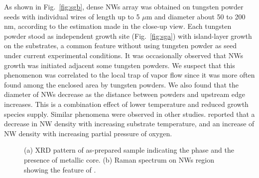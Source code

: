 As shown in Fig.~\ref{fig:sgb}, dense NWs array was obtained on tungsten powder seeds with individual wires of length up to 5 $\mu$m and diameter about 50 to 200 nm, according to the estimation made in the close-up view. Each tungsten powder stood as independent growth site (Fig.~\ref{fig:sga}) with island-layer growth on the substrates, a common feature without using tungsten powder as seed under current experimental conditions. It was occasionally observed that NWs growth was initiated adjacent some tungsten powders. We suspect that this phenomenon was correlated to the local trap of vapor flow since it was more often found among the enclosed area by tungsten powders. We also found that the diameter of NWs decrease as the distance between powders and upstream edge increases. This is a combination effect of lower temperature and reduced  growth species supply. Similar phenomena were observed in other studies. \citeauthor{Thangala2007} reported that a decrease in NW density with increasing substrate temperature, and an increase of NW density with increasing partial pressure of oxygen.\cite{Thangala2007}
\begin{figure}[htb]
\centering
{}\hspace{0.04\textwidth}
\caption[Characterization of seeded growth : XRD and Raman]{ (a) XRD pattern of as-prepared sample indicating the  phase and the presence of metallic core. (b) Raman spectrum on NWs region showing the feature of .}
\label{fig:woseedxrd}
\end{figure}

